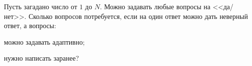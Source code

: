 Пусть загадано число от $1$ до $N$. Можно задавать любые вопросы на <<да/нет>>. Сколько вопросов
потребуется, если на один ответ можно дать неверный ответ, а вопросы:
\begin{enumcyr}
    \item можно задавать адаптивно;
    \item нужно написать заранее?
\end{enumcyr}
